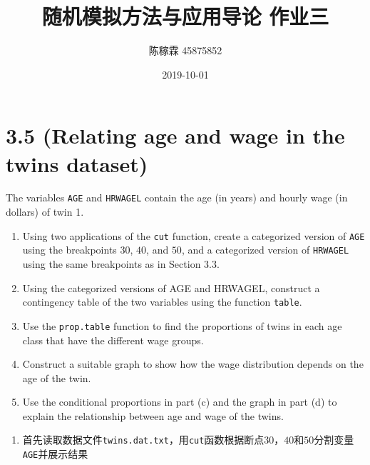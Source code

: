 \documentclass[]{article}
\title{随机模拟方法与应用导论 作业三}
\author{陈稼霖 45875852}
\date{2019-10-01}
\newenvironment{Shaded}{\begin{snugshade}}{\end{snugshade}}
\newcommand{\DataTypeTok}[1]{\textcolor[rgb]{0.13,0.29,0.53}{#1}}
\newcommand{\DecValTok}[1]{\textcolor[rgb]{0.00,0.00,0.81}{#1}}
\newcommand{\KeywordTok}[1]{\textcolor[rgb]{0.13,0.29,0.53}{\textbf{#1}}}
\newcommand{\NormalTok}[1]{#1}
\newcommand{\OperatorTok}[1]{\textcolor[rgb]{0.81,0.36,0.00}{\textbf{#1}}}
\newcommand{\OtherTok}[1]{\textcolor[rgb]{0.56,0.35,0.01}{#1}}
\newcommand{\StringTok}[1]{\textcolor[rgb]{0.31,0.60,0.02}{#1}}
\providecommand{\tightlist}{%
  \setlength{\itemsep}{0pt}\setlength{\parskip}{0pt}}
\begin{document}
\maketitle

\hypertarget{relating-age-and-wage-in-the-twins-dataset}{%
\section{3.5 (Relating age and wage in the twins
dataset)}\label{relating-age-and-wage-in-the-twins-dataset}}

The variables \texttt{AGE} and \texttt{HRWAGEL} contain the age (in
years) and hourly wage (in dollars) of twin 1.

\begin{enumerate}
\def\labelenumi{\alph{enumi}.}
\item
  Using two applications of the \texttt{cut} function, create a
  categorized version of \texttt{AGE} using the breakpoints \(30\),
  \(40\), and \(50\), and a categorized version of \texttt{HRWAGEL}
  using the same breakpoints as in Section 3.3.
\item
  Using the categorized versions of AGE and HRWAGEL, construct a
  contingency table of the two variables using the function
  \texttt{table}.
\item
  Use the \texttt{prop.table} function to find the proportions of twins
  in each age class that have the different wage groups.
\item
  Construct a suitable graph to show how the wage distribution depends
  on the age of the twin.
\item
  Use the conditional proportions in part (c) and the graph in part (d)
  to explain the relationship between age and wage of the twins.
\end{enumerate}

\begin{enumerate}
\def\labelenumi{\alph{enumi}.}
\tightlist
\item
  首先读取数据文件\texttt{twins.dat.txt}，用\texttt{cut}函数根据断点\(30\)，\(40\)和\(50\)分割变量\texttt{AGE}并展示结果
\end{enumerate}

\begin{Shaded}
\end{Shaded}
\end{document}
